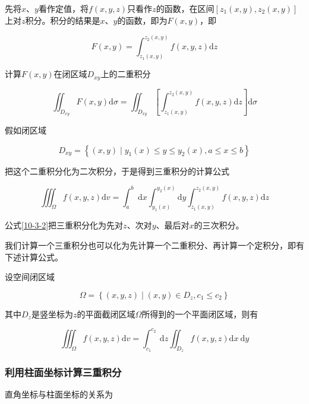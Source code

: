 \documentclass[12pt, a4paper]{article}
\numberwithin{equation}{section}
\newcommand{\rmd}{\mathrm{d}}
\begin{document}
    先将\(x \)、\(y \)看作定值，将\(f\left(x,y,z \right)\)只看作\(z \)的函数，在区间\(\left[z_1\left(x,y\right),z_2\left(x,y\right)\right]\)
    上对\(z \)积分。积分的结果是\(x \)、\(y \)的函数，即为\(F\left(x,y \right)\)，即

    \[
        F\left(x,y \right) = \int_{z_1\left(x,y\right)}^{z_2\left(x,y\right)} f\left(x,y,z \right) \rmd z
    \]

    计算\(F\left(x,y \right)\)在闭区域\(D_{xy}\)上的二重积分

    $$
        \iint_{D_{x y}} F(x, y) \mathrm{d} \sigma=\iint_{D_{x y}}\left[\int_{z_1(x, y)}^{z_2(x, y)} f(x, y, z) \mathrm{d} z\right] \mathrm{d} \sigma
    $$

    假如闭区域

    $$
        D_{x y}=\left\{(x, y) \mid y_1(x) \leq y \leq y_2(x), a \leq x \leq b\right\}
    $$

    把这个二重积分化为二次积分，于是得到三重积分的计算公式

    \begin{equation}
        \iiint_{\varOmega} f(x, y, z) \mathrm{d} v=\int_a^b \mathrm{~d} x \int_{y_1(x)}^{y_2(x)} \mathrm{d} y \int_{z_1(x, y)}^{z_2(x, y)} f(x, y, z) \mathrm{d} z
        \label{10-3-2}
    \end{equation}

    公式\ref{10-3-2}把三重积分化为先对\(z \)、次对\(y \)、最后对\(x \)的三次积分。

    我们计算一个三重积分也可以化为先计算一个二重积分、再计算一个定积分，即有下述计算公式。

    设空间闭区域

    \[
        \varOmega = \left\{\left(x,y,z\right) \mid \left(x,y\right) \in D_{z}, c_1 \leq c_2\right\}
    \]

    其中\(D_{z }\)是竖坐标为\(z \)的平面截闭区域\(\varOmega\)所得到的一个平面闭区域，则有

    \begin{equation}
        \iiint_{\varOmega} f(x, y, z) \mathrm{d} v=\int_{c_1}^{c_2} \mathrm{~d} z \iint_{D_z} f(x, y, z) \mathrm{d} x \mathrm{~d} y
        \label{10-3-3}
    \end{equation}

\subsubsection{利用柱面坐标计算三重积分}

    直角坐标与柱面坐标的关系为
\end{document}
